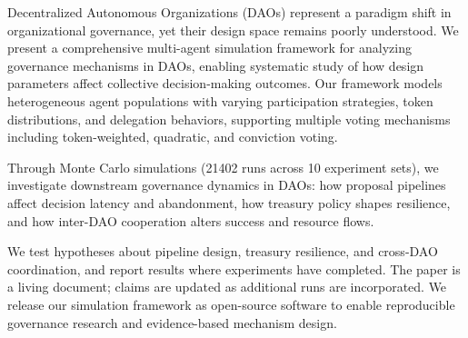
Decentralized Autonomous Organizations (DAOs) represent a paradigm shift in organizational governance, yet their design space remains poorly understood. We present a comprehensive multi-agent simulation framework for analyzing governance mechanisms in DAOs, enabling systematic study of how design parameters affect collective decision-making outcomes. Our framework models heterogeneous agent populations with varying participation strategies, token distributions, and delegation behaviors, supporting multiple voting mechanisms including token-weighted, quadratic, and conviction voting.

Through Monte Carlo simulations (21402 runs across 10 experiment sets), we investigate downstream governance dynamics in DAOs: how proposal pipelines affect decision latency and abandonment, how treasury policy shapes resilience, and how inter-DAO cooperation alters success and resource flows.

We test hypotheses about pipeline design, treasury resilience, and cross-DAO coordination, and report results where experiments have completed. The paper is a living document; claims are updated as additional runs are incorporated. We release our simulation framework as open-source software to enable reproducible governance research and evidence-based mechanism design.

